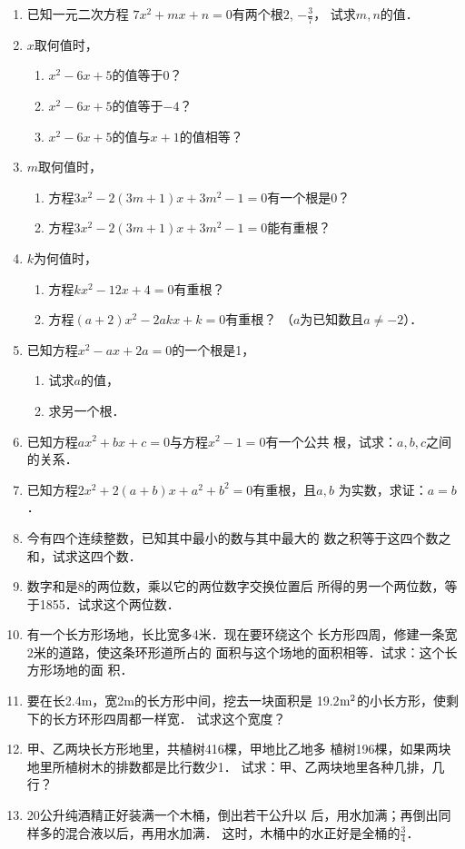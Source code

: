 \begin{enumerate}
\item 已知一元二次方程
$7x^2+mx+n=0$有两个根$2$, $-\frac{3}{7}$，
试求$m,n$的值．

\item $x$取何值时，
\begin{enumerate}
    \item $x^2-6x+5$的值等于0？
    \item $x^2-6x+5$的值等于$-4$？
    \item $x^2-6x+5$的值与$x+1$的值相等？
\end{enumerate}

\item $m$取何值时，
\begin{enumerate}
    \item 方程$3x^2-2(3m+1)x+3m^2-1=0$有一个根是0？
    \item 方程$3x^2-2(3m+1)x+3m^2-1=0$能有重根？
\end{enumerate}

\item $k$为何值时，
\begin{enumerate}
    \item 方程$kx^2-12x+4=0$有重根？
    \item 方程$(a+2)x^2-2akx+k=0$有重根？
（$a$为已知数且$a\ne-2$）．
\end{enumerate}

\item 已知方程$x^2-ax+2a=0$的一个根是1，
\begin{enumerate}
    \item 试求$a$的值，
    \item 求另一个根．
\end{enumerate}

\item 已知方程$ax^2+bx+c=0$与方程$x^2-1=0$有一个公共
根，试求：$a,b,c$之间的关系．
\item 已知方程$2x^2+2(a+b)x+a^2+b^2=0$有重根，且$a,b$
为实数，求证：$a=b$．
\item 今有四个连续整数，已知其中最小的数与其中最大的
数之积等于这四个数之和，试求这四个数．
\item 数字和是8的两位数，乘以它的两位数字交换位置后
所得的男一个两位数，等于1855．试求这个两位数．
\item 有一个长方形场地，长比宽多4米．现在要环绕这个
长方形四周，修建一条宽2米的道路，使这条环形道所占的
面积与这个场地的面积相等．试求：这个长方形场地的面
积．
\item 要在长2.4m，宽2m的长方形中间，挖去一块面积是
19.2${\rm m^2}$的小长方形，使剩下的长方环形四周都一样宽．
试求这个宽度？
\item 甲、乙两块长方形地里，共植树416棵，甲地比乙地多
植树196棵，如果两块地里所植树木的排数都是比行数少1．
试求：甲、乙两块地里各种几排，几行？
\item 20公升纯酒精正好装满一个木桶，倒出若干公升以
后，用水加满；再倒出同样多的混合液以后，再用水加满．
这时，木桶中的水正好是全桶的$\frac{3}{4}$．


\end{enumerate}

